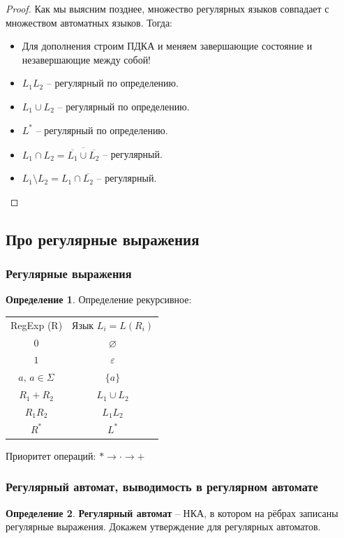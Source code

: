 \documentclass[a4paper,12pt]{article}
\renewcommand{\emptyset}{\ensuremath{\varnothing}}
\theoremstyle{plain}
\theoremstyle{definition}
\newtheorem{definition}{Определение}[subsection]
\theoremstyle{remark}
\begin{document}
\begin{proof}
	Как мы выясним позднее, множество регулярных языков совпадает с множеством автоматных языков. Тогда:
	\begin{itemize}
		\item Для дополнения строим ПДКА и меняем завершающие состояние и незавершающие между собой!
		\item $L_1 L_2$ -- регулярный по определению.
		\item $L_1 \cup L_2$ -- регулярный по определению.
		\item $L^*$ -- регулярный по определению.
		\item $L_1 \cap L_2 = \overline{\overline{L_1} \cup \overline{L_2}}$ -- регулярный.
		\item $L_1 \setminus L_2 = L_1 \cap \overline{L_2}$ -- регулярный.
	\end{itemize}
\end{proof}

\subsection{Про регулярные выражения}
\subsubsection*{Регулярные выражения}
\begin{definition}
	Определение рекурсивное:

	\begin{tabular}{c | c}
		RegExp (R)          & Язык $L_i = L(R_i)$ \\
		$0$                 & $\emptyset$         \\
		$1$                 & ${\varepsilon}$     \\
		$a,\, a \in \Sigma$ & $\{a\}$             \\
		$R_1 + R_2$         & $L_1 \cup L_2$      \\
		$R_1R_2$            & $L_1L_2$            \\
		$R^*$               & $L^*$
	\end{tabular}

	Приоритет операций: $* \to \cdot \to +$
\end{definition}

\subsubsection*{Регулярный автомат, выводимость в регулярном автомате}
\begin{definition}
	\textbf{Регулярный автомат} -- НКА, в котором на рёбрах записаны регулярные выражения. Докажем утверждение для регулярных автоматов.
\end{definition}
\end{document}

